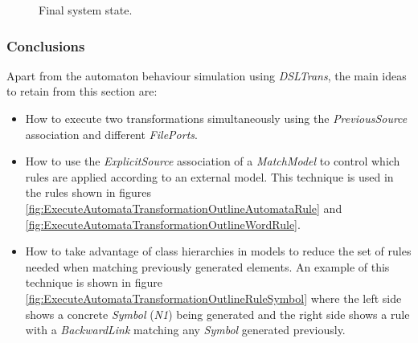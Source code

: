 \begin{figure}[h]
\begin{center}
  \caption{Final system state.}
  \label{fig:final_automaton_system_state}
\end{center}
\end{figure}

\subsubsection{Conclusions}

Apart from the automaton behaviour simulation using \emph{DSLTrans}, the main ideas to retain from this section are:

\begin{itemize}
\item How to execute two transformations simultaneously using the \emph{PreviousSource} association and different \emph{FilePorts}.
\item How to use the \emph{ExplicitSource} association of a \emph{MatchModel} to control which rules are applied according to an external model. This technique is used in the rules shown in figures \ref{fig:ExecuteAutomataTransformationOutlineAutomataRule} and \ref{fig:ExecuteAutomataTransformationOutlineWordRule}.
\item How to take advantage of class hierarchies in models to reduce the set of rules needed when matching previously generated elements. An example of this technique is shown in figure \ref{fig:ExecuteAutomataTransformationOutlineRuleSymbol} where the left side shows a concrete \emph{Symbol} (\emph{N1}) being generated and the right side shows a rule with a \emph{BackwardLink} matching any \emph{Symbol} generated previously.

\end{itemize}

